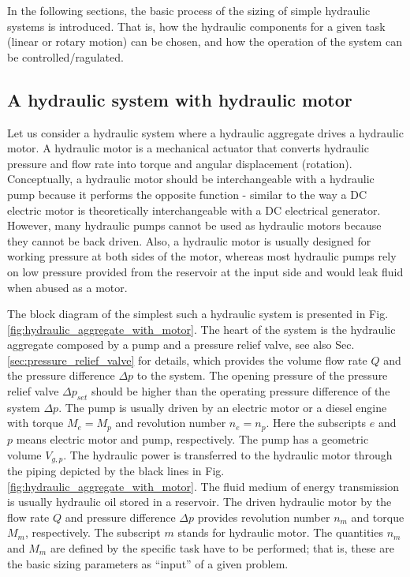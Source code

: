In the following sections, the basic process of the sizing of simple hydraulic systems is introduced. That is, how the hydraulic components for a given task (linear or rotary motion) can be chosen, and how the operation of the system can be controlled/ragulated.

\subsection{A hydraulic system with hydraulic motor} \label{sec:hydraulic_system_with_hydraulic_motor}
Let us consider a hydraulic system where a hydraulic aggregate drives a hydraulic motor. A hydraulic motor is a mechanical actuator that converts hydraulic pressure and flow rate into torque and angular displacement (rotation). Conceptually, a hydraulic motor should be interchangeable with a hydraulic pump because it performs the opposite function - similar to the way a DC electric motor is theoretically interchangeable with a DC electrical generator. However, many hydraulic pumps cannot be used as hydraulic motors because they cannot be back driven. Also, a hydraulic motor is usually designed for working pressure at both sides of the motor, whereas most hydraulic pumps rely on low pressure provided from the reservoir at the input side and would leak fluid when abused as a motor.

The block diagram of the simplest such a hydraulic system is presented in Fig.\,\ref{fig:hydraulic_aggregate_with_motor}. The heart of the system is the hydraulic aggregate composed by a pump and a pressure relief valve, see also Sec.\,\ref{sec:pressure_relief_valve} for details, which provides the volume flow rate $Q$ and the pressure difference $\Delta p$ to the system. The opening pressure of the pressure relief valve $\Delta p_{set}$ should be higher than the operating pressure difference of the system $\Delta p$. The pump is usually driven by an electric motor or a diesel engine with torque $M_e=M_p$ and revolution number $n_e=n_p$. Here the subscripts $e$ and $p$ means electric motor and pump, respectively. The pump has a geometric volume $V_{g,p}$. The hydraulic power is transferred to the hydraulic motor through the piping depicted by the black lines in Fig.\,\ref{fig:hydraulic_aggregate_with_motor}. The fluid medium of energy transmission is usually hydraulic oil stored in a reservoir. The driven hydraulic motor by the flow rate $Q$ and pressure difference $\Delta p$ provides revolution number $n_m$ and torque $M_m$, respectively. The subscript $m$ stands for hydraulic motor. The quantities $n_m$ and $M_m$ are defined by the specific task have to be performed; that is, these are the basic sizing parameters as ``input'' of a given problem. 

